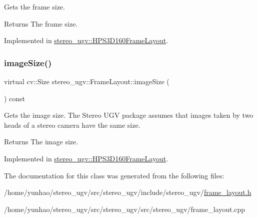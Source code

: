 Gets the frame size. 

\begin{DoxyReturn}{Returns}
The frame size. 
\end{DoxyReturn}


Implemented in \hyperlink{classstereo__ugv_1_1HPS3D160FrameLayout_add697132a4d32b0f1fc49f35f3b8fa0f}{stereo\+\_\+ugv\+::\+H\+P\+S3\+D160\+Frame\+Layout}.

\mbox{\label{classstereo__ugv_1_1FrameLayout_a12cc36a89f8e66ffc6a2fa5eb3c5f648}} 
\subsubsection{\texorpdfstring{image\+Size()}{imageSize()}}
{\footnotesize\ttfamily virtual cv\+::\+Size stereo\+\_\+ugv\+::\+Frame\+Layout\+::image\+Size (\begin{DoxyParamCaption}{ }\end{DoxyParamCaption}) const\hspace{0.3cm}{\ttfamily [pure virtual]}}



Gets the image size. The Stereo U\+GV package assumes that images taken by two heads of a stereo camera have the same size. 

\begin{DoxyReturn}{Returns}
The image size. 
\end{DoxyReturn}


Implemented in \hyperlink{classstereo__ugv_1_1HPS3D160FrameLayout_ab7fb47261d8a8132ac0ca7a15b69500e}{stereo\+\_\+ugv\+::\+H\+P\+S3\+D160\+Frame\+Layout}.



The documentation for this class was generated from the following files\+:\begin{DoxyCompactItemize}
\item 
/home/yunhao/stereo\+\_\+ugv/src/stereo\+\_\+ugv/include/stereo\+\_\+ugv/\hyperlink{frame__layout_8h}{frame\+\_\+layout.\+h}\item 
/home/yunhao/stereo\+\_\+ugv/src/stereo\+\_\+ugv/src/stereo\+\_\+ugv/frame\+\_\+layout.\+cpp\end{DoxyCompactItemize}
